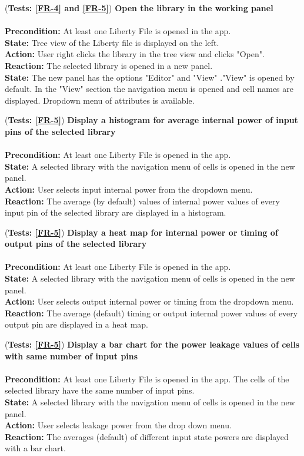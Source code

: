 \documentclass[10pt,a4paper]{report}
\newcommand{\precondition}[1]{
    \textbf{Precondition: } #1 \leavevmode \\
}
\newcommand{\action}[1]{
    \textbf{Action: } #1 \leavevmode \\
}
\newcommand{\state}[1]{
    \textbf{State: } #1 \leavevmode \\
}
\newcommand{\reaction}[1]{
    \textbf{Reaction: } #1 \leavevmode \\
}
\newcommand{\GTCDescription}[2]{
    (\textbf{Tests: #1}) \textbf{#2} \leavevmode \\
}
\begin{document}
\begin{GTC}
    \item \GTCDescription{\ref{FR-4} and \ref{FR-5}}
    {Open the library in the working panel} \leavevmode \\ 
        \precondition{At least one Liberty File is opened in the app.}
        \state{Tree view of the Liberty file is displayed on the left.}
        \action{User right clicks the library in the tree view and clicks "Open".}
        \reaction{The selected library is opened in a new panel.}
        \state{The new panel has the options "Editor" and "View" ."View" is opened by default. In the "View" section the navigation menu is opened and cell names are displayed. Dropdown menu of attributes is available.}\label{GTC-7}
    
    \item \GTCDescription{\ref{FR-5}}
    {Display a histogram for average internal power of input pins of the selected library} \leavevmode \\ 
        \precondition{At least one Liberty File is opened in the app. }
        \state{A selected library with the navigation menu of cells is opened in the new panel.}
        \action{User selects input internal power from the dropdown menu. }
        \reaction{The average (by default) values of internal power values of every input pin of the selected library are displayed in a histogram.}\label{GTC-8}
    
    \item \GTCDescription{\ref{FR-5}}
    {Display a heat map for internal power or timing of output pins of the selected library} \leavevmode \\ 
        \precondition{At least one Liberty File is opened in the app.}
        \state{A selected library with the navigation menu of cells is opened in the new panel.}
        \action{User selects output internal power or timing from the dropdown menu.}
        \reaction{The average (default) timing or output internal power values of every output pin are displayed in a heat map.}\label{GTC-9}
    
    \item \GTCDescription{\ref{FR-5}}
    {Display a bar chart for the power leakage values of cells with same number of input pins} \leavevmode \\ 
        \precondition{At least one Liberty File is opened in the app. The cells of the selected library have the same number of input pins.}
        \state{A selected library with the navigation menu of cells is opened in the new panel.}
        \action{User selects leakage power from the drop down menu.}
        \reaction{The averages (default) of different input state powers are displayed with a bar chart.} \label{GTC-10}
    

\end{GTC}
\end{document}
